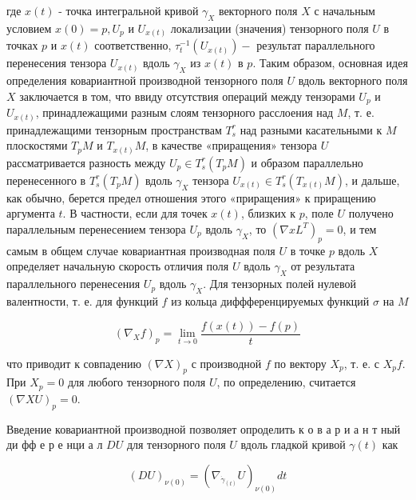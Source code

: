 \documentclass[10pt]{article}
\begin{document}
где $x(t)$ - точка интегральной кривой $\gamma_{X}$ векторного поля $X$ с начальным условием $x(0)=p, U_{p}$ и $U_{x(t)}$ локализации (значения) тензорного поля $U$ в точках $p$ и $x(t)$ соответственно, $\tau_{t}^{-1}\left(U_{x(t)}\right)-$ результат параллельного перенесения тензора $U_{x(t)}$ вдоль $\gamma_{X}$ из $x(t)$ в $p$. Таким образом, основная идея определения ковариантной производной тензорного поля $U$ вдоль векторного поля $X$ заключается в том, что ввиду отсутствия операций между тензорами $U_{p}$ и $U_{x(t)}$, принадлежащими разным слоям тензорного расслоения над $M$, т. е. принадлежащими тензорным пространствам $T_{s}^{r}$ над разными касательными к $M$ плоскостями $T_{p} M$ и $T_{x(t)} M$, в качестве «приращения» тензора $U$ рассматривается разность между $U_{p} \in T_{s}^{r}\left(T_{p} M\right)$ и образом параллельно перенесенного в $T_{s}^{r}\left(T_{p} M\right)$ вдоль $\gamma_{X}$ тензора $U_{x(t)} \in T_{s}^{r}\left(T_{x(t)} M\right)$, и дальше, как обычно, берется предел отношения этого «приращения» к приращению аргумента $t$. В частности, если для точек $x(t)$, близких к $p$, поле $U$ получено параллельным перенесением тензора $U_{p}$ вдоль $\gamma_{X}$, то $\left(\nabla x L^{T}\right)_{p}=0$, и тем самым в общем случае ковариантная производная поля $U$ в точке $p$ вдоль $X$ определяет начальную скорость отличия поля $U$ вдоль $\gamma_{X}$ от результата параллельного перенесения $U_{p}$ вдоль $\gamma_{X}$. Для тензорных полей нулевой валентности, т. е. для функций $f$ из кольца диффференцируемых функций $\mathscr{\sigma}$ на $M$



\[

\left(\nabla_{X} f\right)_{p}=\lim _{t \rightarrow 0} \frac{f(x(t))-f(p)}{t}

\]



что приводит к совпадению $(\nabla X)_{p}$ с производной $f$ по вектору $X_{p}$, т. е. с $X_{p} f$. При $X_{p}=0$ для любого тензорного поля $U$, по определению, считается $(\nabla X U)_{p}=0$.



Введение ковариантной производной позволяет опроделить к о в а р и а н т ный ди фф е р е нци а л $D U$ для тензорного поля $U$ вдоль гладкой кривой $\gamma(t)$ как



\[

(D U)_{\nu(0)}=\left(\nabla_{\dot{\gamma}_{(t)}} U\right)_{\nu(0)} d t

\]
\end{document}
